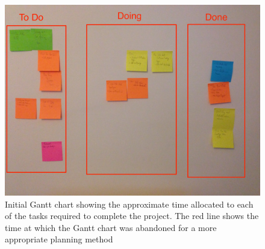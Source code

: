 \documentclass[../../main.tex]{subfiles}
\begin{document}
	\begin{center}
	\begin{figure}[H]
		\vspace{50mm}\centerline{\includegraphics[scale = 0.15]{Sections/ProjectManagement/images/kanban_edit.jpg}}
		\caption{Initial Gantt chart showing the approximate time allocated to each of the tasks required to complete the project. The red line shows the time at which the Gantt chart was abandoned for a more appropriate planning method}
		\label{kanban}
	\end{figure}
	\end{center}

\end{document}
